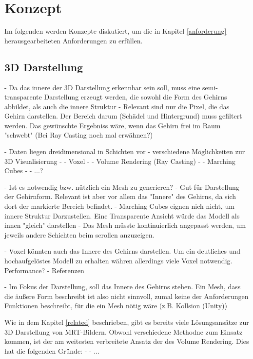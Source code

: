 
\chapter{Konzept}
\label{konzept}

Im folgenden werden Konzepte diskutiert, um die in Kapitel \ref{anforderung} herausgearbeiteten Anforderungen zu erfüllen.

\section{3D Darstellung}

- Da das innere der 3D Darstellung erkennbar sein soll, muss eine semi-transparente Darstellung erzeugt werden, die sowohl die Form des Gehirns abbildet, als auch die innere Struktur
- Relevant sind nur die Pixel, die das Gehirn darstellen. Der Bereich darum (Schädel und Hintergrund) muss gefiltert werden. Das gewünschte Ergebniss wäre, wenn das Gehirn frei im Raum "schwebt" (Bei Ray Casting noch mal erwähnen?)

- Daten liegen dreidimensional in Schichten vor
- verschiedene Möglichkeiten zur 3D Visualisierung
- - Voxel
- - Volume Rendering (Ray Casting)
- - Marching Cubes
- - ...?

- Ist es notwendig bzw. nützlich ein  Mesh zu generieren?
	- Gut für Darstellung der Gehirnform. Relevant ist aber vor allem das "Innere" des Gehirns, da sich dort der markierte Bereich befindet. 
	- Marching Cubes eignen nich nicht, um innere Struktur Darzustellen. Eine Transparente Ansicht würde das Modell als innen "gleich" darstellen
	- Das Mesh müsste kontinuierlich angepasst werden, um jeweils andere Schichten beim scrollen anzuzeigen.
	
	- Voxel könnten auch das Innere des Gehirns darstellen. Um ein deutliches und hochaufgelöstes Modell zu erhalten währen allerdings viele Voxel notwendig. Performance?
	- Referenzen
	
	- Im Fokus der Darstellung, soll das Innere des Gehirns stehen. Ein Mesh, dass die äußere Form beschreibt ist also nicht sinnvoll, zumal keine der Anforderungen Funktionen beschreibt, für die ein Mesh nötig wäre (z.B. Kollsion (Unity))
	
Wie in dem Kapitel \ref{related} beschrieben, gibt es bereits viele Lösungsansätze zur 3D Darstellung von MRT-Bildern. Obwohl verschiedene Methodne zum Einsatz kommen, ist der am weitesten verbreitete Ansatz der des Volume Rendering.
Dies hat die folgenden Gründe:
- 
- ...
	
